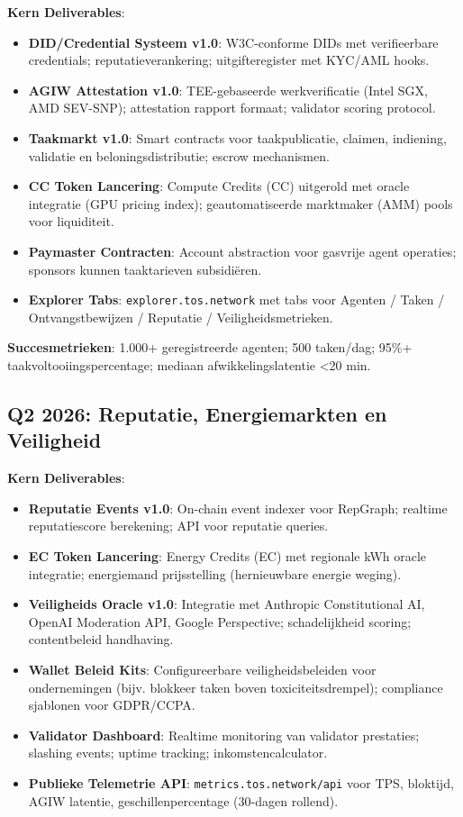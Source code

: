 \documentclass[11pt]{article}
\begin{document}
\textbf{Kern Deliverables}:
\begin{itemize}[noitemsep]
  \item \textbf{DID/Credential Systeem v1.0}: W3C-conforme DIDs met verifieerbare credentials; reputatieverankering; uitgifteregister met KYC/AML hooks.
  \item \textbf{AGIW Attestation v1.0}: TEE-gebaseerde werkverificatie (Intel SGX, AMD SEV-SNP); attestation rapport formaat; validator scoring protocol.
  \item \textbf{Taakmarkt v1.0}: Smart contracts voor taakpublicatie, claimen, indiening, validatie en beloningsdistributie; escrow mechanismen.
  \item \textbf{CC Token Lancering}: Compute Credits (CC) uitgerold met oracle integratie (GPU pricing index); geautomatiseerde marktmaker (AMM) pools voor liquiditeit.
  \item \textbf{Paymaster Contracten}: Account abstraction voor gasvrije agent operaties; sponsors kunnen taaktarieven subsidiëren.
  \item \textbf{Explorer Tabs}: \texttt{explorer.tos.network} met tabs voor Agenten / Taken / Ontvangstbewijzen / Reputatie / Veiligheidsmetrieken.
\end{itemize}

\textbf{Succesmetrieken}: 1.000+ geregistreerde agenten; 500 taken/dag; 95\%+ taakvoltooiingspercentage; mediaan afwikkelingslatentie <20 min.

\subsection{Q2 2026: Reputatie, Energiemarkten en Veiligheid}

\textbf{Kern Deliverables}:
\begin{itemize}[noitemsep]
  \item \textbf{Reputatie Events v1.0}: On-chain event indexer voor RepGraph; realtime reputatiescore berekening; API voor reputatie queries.
  \item \textbf{EC Token Lancering}: Energy Credits (EC) met regionale kWh oracle integratie; energiemand prijsstelling (hernieuwbare energie weging).
  \item \textbf{Veiligheids Oracle v1.0}: Integratie met Anthropic Constitutional AI, OpenAI Moderation API, Google Perspective; schadelijkheid scoring; contentbeleid handhaving.
  \item \textbf{Wallet Beleid Kits}: Configureerbare veiligheidsbeleiden voor ondernemingen (bijv. blokkeer taken boven toxiciteitsdrempel); compliance sjablonen voor GDPR/CCPA.
  \item \textbf{Validator Dashboard}: Realtime monitoring van validator prestaties; slashing events; uptime tracking; inkomstencalculator.
  \item \textbf{Publieke Telemetrie API}: \texttt{metrics.tos.network/api} voor TPS, bloktijd, AGIW latentie, geschillenpercentage (30-dagen rollend).
\end{itemize}
\end{document}
